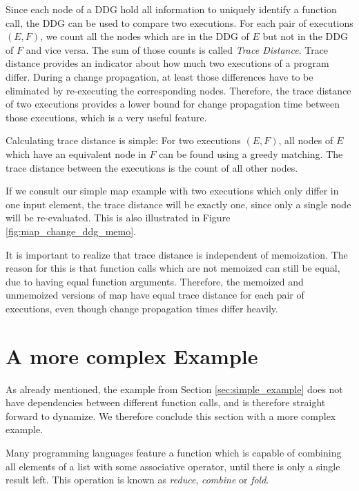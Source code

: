 Since each node of a DDG hold all information to uniquely identify a function call, the DDG can be used to compare two executions. For each pair of executions $(E, F)$, we count all the nodes which are in the DDG of $E$ but not in the DDG of $F$ and vice versa. The sum of those counts is called \textit{Trace Distance}. Trace distance provides an indicator about how much two executions of a program differ. During a change propagation, at least those differences have to be eliminated by re-executing the corresponding nodes. Therefore, the trace distance of two executions provides a lower bound for change propagation time between those executions, which is a very useful feature. 

Calculating trace distance is simple: For two executions $(E, F)$, all nodes of $E$ which have an equivalent node in $F$ can be found using a greedy matching. The trace distance between the executions is the count of all other nodes. 

If we consult our simple map example with two executions which only differ in one input element, the trace distance will be exactly one, since only a single node will be re-evaluated. This is also illustrated in Figure \ref{fig:map_change_ddg_memo}.

It is important to realize that trace distance is independent of memoization. The reason for this is that function calls which are not memoized can still be equal, due to having equal function arguments. Therefore, the memoized and unmemoized versions of map have equal trace distance for each pair of executions, even though change propagation times differ heavily.    



\section{A more complex Example}

As already mentioned, the example from Section \ref{sec:simple_example} does not have dependencies between different function calls, and is therefore straight forward to dynamize. We therefore conclude this section with a more complex example. 

Many programming languages feature a function which is capable of combining all elements of a list with some associative operator, until there is only a single result left. This operation is known as \textit{reduce}, \textit{combine} or \textit{fold}.  


